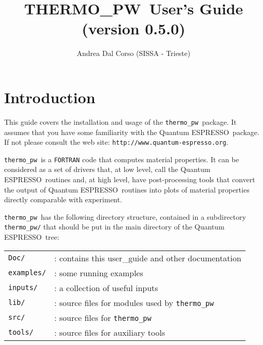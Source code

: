 \documentclass[12pt,a4paper]{article}
\def\version{0.5.0}
\def\qe{{\sc Quantum ESPRESSO}}
\def\tpw{{\sc THERMO\_PW}}
\def\thermo{\texttt{thermo\_pw}}
\begin{document}
 
\author{Andrea Dal Corso (SISSA - Trieste)}
\date{}


\title{
  \vskip 1cm
  {\color{red} \Huge \tpw\ User's Guide} \\
  \Large (version \version)
}

\maketitle

\tableofcontents

\newpage

\section{\color{coral}Introduction}

This guide covers the installation and usage of the \thermo\ package. 
It assumes that you have some familiarity with the \qe\ package. 
If not please consult the web site: \texttt{http://www.quantum-espresso.org}.

\thermo\ is a \texttt{FORTRAN} code that computes material properties.
It can be considered as a set of drivers that,
at low level, call the \qe\ routines and, at high level, have post-processing 
tools that convert the output of \qe\ routines into plots of material 
properties directly comparable with experiment.

\thermo\ has the following directory structure, contained in a subdirectory 
\texttt{thermo\_pw/} that should be put in the main directory of the \qe\ tree:

\begin{tabular}{ll}
\texttt{Doc/}      & : contains this user\_guide and other documentation\\
\texttt{examples/} & : some running examples \\
\texttt{inputs/}   & : a collection of useful inputs \\
\texttt{lib/}      & : source files for modules used by \thermo\ \\
\texttt{src/}      & : source files for \thermo\ \\
\texttt{tools/}    & : source files for auxiliary tools \\
\end{tabular}\\
\end{document}
